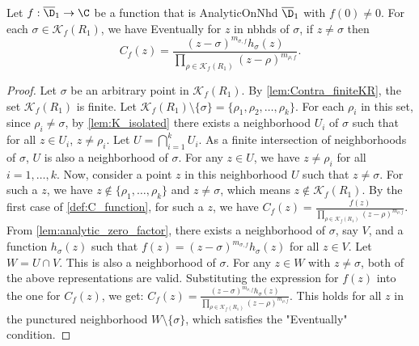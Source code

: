 \begin{lemma}\label{lem:C_at_sigma_offK0} \leanok {}
Let $f:\overline{\D}_1\to\C$ be a function that is AnalyticOnNhd $\overline{\D}_1$ with $f(0)\neq0$. For each $\sigma \in \mathcal{K}_f(R_1)$, we have Eventually for $z$ in nbhds of $\sigma$, if $z\neq\sigma$ then
\[C_f(z) = \frac{(z-\sigma)^{m_{\sigma,f}} h_\sigma(z)}{\prod_{\rho\in\mathcal{K}_f(R_1)}(z-\rho)^{m_{\rho,f}}}.\]
\end{lemma}
\begin{proof}
\leanok
Let $\sigma$ be an arbitrary point in $\mathcal{K}_f(R_1)$.
By \cref{lem:Contra_finiteKR}, the set $\mathcal{K}_f(R_1)$ is finite. Let $\mathcal{K}_f(R_1) \setminus \{\sigma\} = \{\rho_1, \rho_2, \dots, \rho_k\}$.
For each $\rho_i$ in this set, since $\rho_i \neq \sigma$, by \cref{lem:K_isolated} there exists a neighborhood $U_i$ of $\sigma$ such that for all $z \in U_i$, $z \neq \rho_i$.
Let $U = \bigcap_{i=1}^k U_i$. As a finite intersection of neighborhoods of $\sigma$, $U$ is also a neighborhood of $\sigma$. For any $z \in U$, we have $z \neq \rho_i$ for all $i=1, \dots, k$.
Now, consider a point $z$ in this neighborhood $U$ such that $z \neq \sigma$. For such a $z$, we have $z \notin \{\rho_1, \dots, \rho_k\}$ and $z \neq \sigma$, which means $z \notin \mathcal{K}_f(R_1)$.
By the first case of \cref{def:C_function}, for such a $z$, we have $C_f(z) = \frac{f(z)}{\prod_{\rho\in\mathcal{K}_f(R_1)}(z-\rho)^{m_{\rho,f}}}$.
From \cref{lem:analytic_zero_factor}, there exists a neighborhood of $\sigma$, say $V$, and a function $h_\sigma(z)$ such that $f(z) = (z-\sigma)^{m_{\sigma,f}} h_\sigma(z)$ for all $z \in V$.
Let $W = U \cap V$. This is also a neighborhood of $\sigma$. For any $z \in W$ with $z \neq \sigma$, both of the above representations are valid. Substituting the expression for $f(z)$ into the one for $C_f(z)$, we get:
$C_f(z) = \frac{(z-\sigma)^{m_{\sigma,f}} h_\sigma(z)}{\prod_{\rho\in\mathcal{K}_f(R_1)}(z-\rho)^{m_{\rho,f}}}$.
This holds for all $z$ in the punctured neighborhood $W \setminus \{\sigma\}$, which satisfies the "Eventually" condition.
\end{proof}

